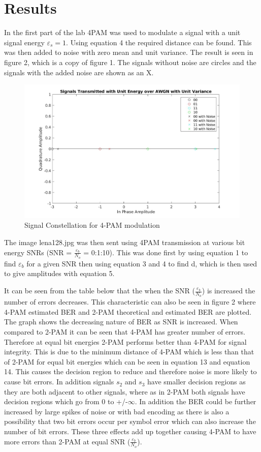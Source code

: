 \documentclass{article}
\begin{document}
\section{Results}
In the first part of the lab 4PAM was used to modulate a signal with a unit signal energy $\varepsilon_s = 1$. Using equation 4 the required distance can be found. This was then added to noise with zero mean and unit variance. The result is seen in figure 2, which is a copy of figure 1. The signals without noise are circles and the signals with the added noise are shown as an X.
\begin{figure}[!h]
        \centering 	\includegraphics[width=.8\linewidth]{signalconst.jpg}
    \caption{Signal Constellation for 4-PAM modulation}
\end{figure}
\clearpage

The image lena128.jpg was then sent using 4PAM transmission at various bit energy SNRs 
(SNR = $\frac{\varepsilon_b}{N_o}$ = 0:1:10). This was done first by using equation 1 to find $\varepsilon_b$ for a given SNR then using equation 3 and 4 to find d, which is then used to give amplitudes with equation 5. 

It can be seen from the table below that the when the SNR ($\frac{\varepsilon_b}{N_o}$) is increased the number of errors decreases. This characteristic can also be seen in figure 2 where 4-PAM estimated BER and 2-PAM theoretical and estimated BER are plotted. The graph shows the decreasing nature of BER as SNR is increased. When compared to 2-PAM it can be seen that 4-PAM has greater number of errors. Therefore at equal bit energies 2-PAM performs better than 4-PAM for signal integrity. This is due to the minimum distance of 4-PAM which is less than that of 2-PAM for equal bit energies which can be seen in equation 13 and equation 14. This causes the decision region to reduce and therefore noise is more likely to cause bit errors. In addition signals $s_2$ and $s_3$ have smaller decision regions as they are both adjacent to other signals, where as in 2-PAM both signals have decision regions which go from 0 to +/-$\infty$. In addition the BER could be further increased by large spikes of noise or with bad encoding as there is also a possibility that two bit errors occur per symbol error which can also increase the number of bit errors. These three effects add up together causing 4-PAM to have more errors than 2-PAM at equal SNR ($\frac{\varepsilon_b}{N_o}$). 
\end{document}
